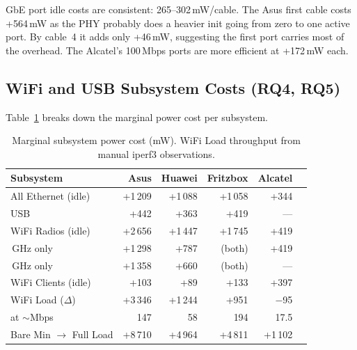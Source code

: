 \ac{GbE} port idle costs are consistent: 265--302\,mW/cable. The Asus first cable costs +564\,mW as the \ac{PHY} probably does a heavier init going from zero to one active port. By cable~4 it adds only +46\,mW, suggesting the first port carries most of the overhead. The Alcatel's 100\,Mbps ports are more efficient at +172\,mW each.

\subsection{WiFi and \ac{USB} Subsystem Costs (RQ4, RQ5)}
\label{sec:test3-rq4-rq5}

Table~\ref{tab:test3_subsystem_costs} breaks down the marginal power cost per subsystem.

\begin{table}[H]
    \centering
    \caption{Marginal subsystem power cost (mW). WiFi Load throughput from manual iperf3 observations.}
    \label{tab:test3_subsystem_costs}
    \small\renewcommand{\arraystretch}{0.88}
    \begin{tabular}{l r r r r r}
        \toprule
        \textbf{Subsystem} & \textbf{Asus} & \textbf{Huawei} & \textbf{Fritzbox} & \textbf{Alcatel} \\
        \midrule
        All Ethernet (idle)     & +1\,209  & +1\,088  & +1\,058  & +344 \\
        \ac{USB}                     & +442     & +363     & +419     & --- \\
        WiFi Radios (idle)      & +2\,656  & +1\,447  & +1\,745  & +419 \\
        \quad 2.4\,GHz only     & +1\,298  & +787     & \multicolumn{1}{r}{(both)} & +419 \\
        \quad 5\,GHz only       & +1\,358  & +660     & \multicolumn{1}{r}{(both)} & --- \\
        WiFi Clients (idle)     & +103     & +89      & +133     & +397 \\
        WiFi Load ($\Delta$)    & +3\,346  & +1\,244  & +951     & $-$95 \\
        \quad at $\sim$Mbps     & 147      & 58       & 194      & 17.5 \\
        \midrule
        Bare Min $\rightarrow$ Full Load & +8\,710 & +4\,964 & +4\,811 & +1\,102 \\
        \bottomrule
    \end{tabular}
\end{table}

